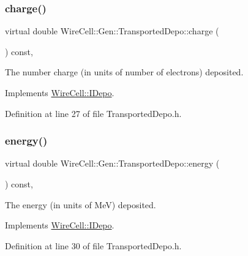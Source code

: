 \subsubsection{\texorpdfstring{charge()}{charge()}}
{\footnotesize\ttfamily virtual double Wire\+Cell\+::\+Gen\+::\+Transported\+Depo\+::charge (\begin{DoxyParamCaption}{ }\end{DoxyParamCaption}) const\hspace{0.3cm}{\ttfamily [inline]}, {\ttfamily [virtual]}}



The number charge (in units of number of electrons) deposited. 



Implements \hyperlink{class_wire_cell_1_1_i_depo_a096a0b84b90685700f26950b0523c43c}{Wire\+Cell\+::\+I\+Depo}.



Definition at line 27 of file Transported\+Depo.\+h.

\mbox{\label{class_wire_cell_1_1_gen_1_1_transported_depo_a126a3460f7f190b9049bfbbe1b988607}} 
\subsubsection{\texorpdfstring{energy()}{energy()}}
{\footnotesize\ttfamily virtual double Wire\+Cell\+::\+Gen\+::\+Transported\+Depo\+::energy (\begin{DoxyParamCaption}{ }\end{DoxyParamCaption}) const\hspace{0.3cm}{\ttfamily [inline]}, {\ttfamily [virtual]}}



The energy (in units of MeV) deposited. 



Implements \hyperlink{class_wire_cell_1_1_i_depo_a5dad2495f4b329fede8397203824f311}{Wire\+Cell\+::\+I\+Depo}.



Definition at line 30 of file Transported\+Depo.\+h.

\mbox{\label{class_wire_cell_1_1_gen_1_1_transported_depo_a90f1faf2049eea77065f41492c18256a}} 
